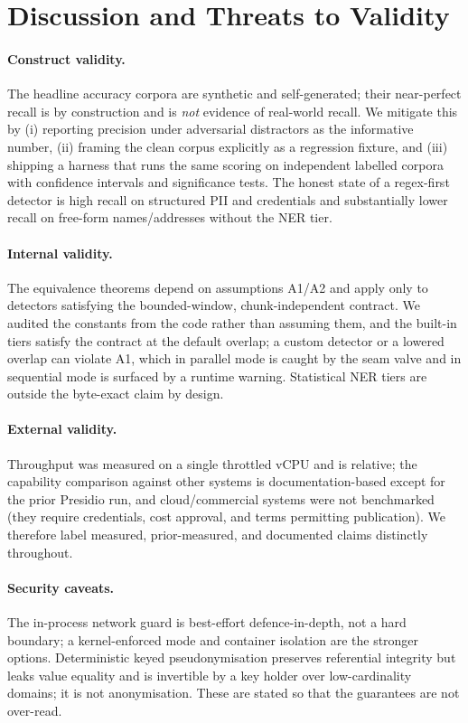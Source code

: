 \documentclass[runningheads]{llncs}
\begin{document}
\section{Discussion and Threats to Validity}
\label{sec:discussion}

\paragraph{Construct validity.}
The headline accuracy corpora are synthetic and self-generated; their
near-perfect recall is by construction and is \emph{not} evidence of real-world
recall. We mitigate this by (i) reporting precision under adversarial distractors
as the informative number, (ii) framing the clean corpus explicitly as a
regression fixture, and (iii) shipping a harness that runs the same scoring on
independent labelled corpora with confidence intervals and significance tests.
The honest state of a regex-first detector is high recall on structured PII and
credentials and substantially lower recall on free-form names/addresses without
the NER tier.

\paragraph{Internal validity.}
The equivalence theorems depend on assumptions A1/A2 and apply only to detectors
satisfying the bounded-window, chunk-independent contract. We audited the
constants from the code rather than assuming them, and the built-in tiers satisfy
the contract at the default overlap; a custom detector or a lowered overlap can
violate A1, which in parallel mode is caught by the seam valve and in sequential
mode is surfaced by a runtime warning. Statistical NER tiers are outside the
byte-exact claim by design.

\paragraph{External validity.}
Throughput was measured on a single throttled vCPU and is relative; the
capability comparison against other systems is documentation-based except for the
prior Presidio run, and cloud/commercial systems were not benchmarked (they
require credentials, cost approval, and terms permitting publication). We
therefore label measured, prior-measured, and documented claims distinctly
throughout.

\paragraph{Security caveats.}
The in-process network guard is best-effort defence-in-depth, not a hard
boundary; a kernel-enforced mode and container isolation are the stronger
options. Deterministic keyed pseudonymisation preserves referential integrity but
leaks value equality and is invertible by a key holder over low-cardinality
domains; it is not anonymisation. These are stated so that the guarantees are not
over-read.
\end{document}
